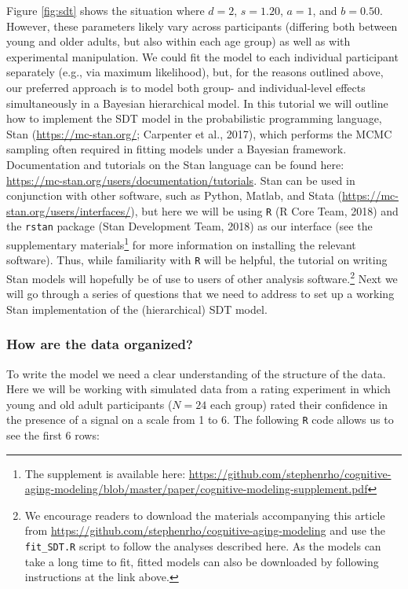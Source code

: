 \documentclass[
  english,
  ,man,floatsintext]{apa6}
\begin{document}
Figure \ref{fig:sdt} shows the situation where \(d = 2\), \(s = 1.20\), \(a = 1\), and \(b = 0.50\). However, these parameters likely vary across participants (differing both between young and older adults, but also within each age group) as well as with experimental manipulation. We could fit the model to each individual participant separately (e.g., via maximum likelihood), but, for the reasons outlined above, our preferred approach is to model both group- and individual-level effects simultaneously in a Bayesian hierarchical model. In this tutorial we will outline how to implement the SDT model in the probabilistic programming language, Stan (\url{https://mc-stan.org/}; Carpenter et al., 2017), which performs the MCMC sampling often required in fitting models under a Bayesian framework. Documentation and tutorials on the Stan language can be found here: \url{https://mc-stan.org/users/documentation/tutorials}. Stan can be used in conjunction with other software, such as Python, Matlab, and Stata (\url{https://mc-stan.org/users/interfaces/}), but here we will be using \texttt{R} (R Core Team, 2018) and the \texttt{rstan} package (Stan Development Team, 2018) as our interface (see the supplementary materials\footnote{The supplement is available here: \url{https://github.com/stephenrho/cognitive-aging-modeling/blob/master/paper/cognitive-modeling-supplement.pdf}} for more information on installing the relevant software). Thus, while familiarity with \texttt{R} will be helpful, the tutorial on writing Stan models will hopefully be of use to users of other analysis software.\footnote{We encourage readers to download the materials accompanying this article from \url{https://github.com/stephenrho/cognitive-aging-modeling} and use the \texttt{fit\_SDT.R} script to follow the analyses described here. As the models can take a long time to fit, fitted models can also be downloaded by following instructions at the link above.} Next we will go through a series of questions that we need to address to set up a working Stan implementation of the (hierarchical) SDT model.

\hypertarget{how-are-the-data-organized}{%
\subsubsection{How are the data organized?}\label{how-are-the-data-organized}}

To write the model we need a clear understanding of the structure of the data. Here we will be working with simulated data from a rating experiment in which young and old adult participants (\(N=24\) each group) rated their confidence in the presence of a signal on a scale from 1 to 6. The following \texttt{R} code allows us to see the first 6 rows:
\end{document}
